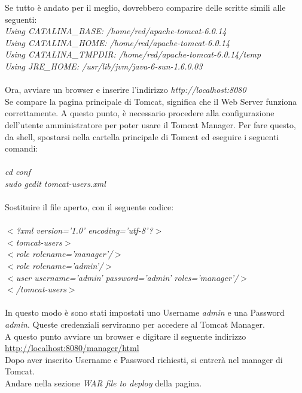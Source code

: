 Se tutto \`e andato per il meglio, dovrebbero comparire delle scritte simili alle seguenti:\\

\textit{Using CATALINA{\_}BASE: /home/red/apache-tomcat-6.0.14}\\
\textit{Using CATALINA{\_}HOME: /home/red/apache-tomcat-6.0.14}\\
\textit{Using CATALINA{\_}TMPDIR: /home/red/apache-tomcat-6.0.14/temp}\\
\textit{Using JRE{\_}HOME: /usr/lib/jvm/java-6-sun-1.6.0.03}\\
\\

Ora, avviare un browser e inserire l'indirizzo \textit{http://localhost:8080}\\
Se compare la pagina principale di Tomcat, significa che il Web Server funziona correttamente.
A questo punto, \`e necessario procedere alla configurazione dell'utente amministratore per poter usare il Tomcat Manager.
Per fare questo, da shell, spostarsi nella cartella principale di Tomcat ed eseguire i seguenti comandi:\\
\\
\textit{cd conf}\\
\textit{sudo gedit tomcat-users.xml}\\
\\
Sostituire il file aperto, con il seguente codice:\\
\\
\textit{$ < $?xml version='1.0' encoding='utf-8'?$ > $}\\
\textit{$ < $tomcat-users$ > $}\\
\textit{ $ < $role rolename='manager'/$ > $}\\
\textit{ $ < $role rolename='admin'/$ > $}\\
\textit{ $ < $user username='admin' password='admin' roles='manager'/$ > $}\\
\textit{$ < $/tomcat-users$ > $} \\
\\
In questo modo \`e sono stati impostati uno Username  \textit{admin} e una Password  \textit{admin}. Queste credenziali serviranno per accedere al Tomcat Manager.\\
A questo punto avviare un browser e digitare il seguente indirizzo\\ \href{http://localhost:8080/manager/html}{http://localhost:8080/manager/html}\\
Dopo aver inserito Username e Password richiesti, si entrer\`a nel manager di Tomcat.\\
Andare nella sezione \textit{WAR file to deploy} della pagina.\\


